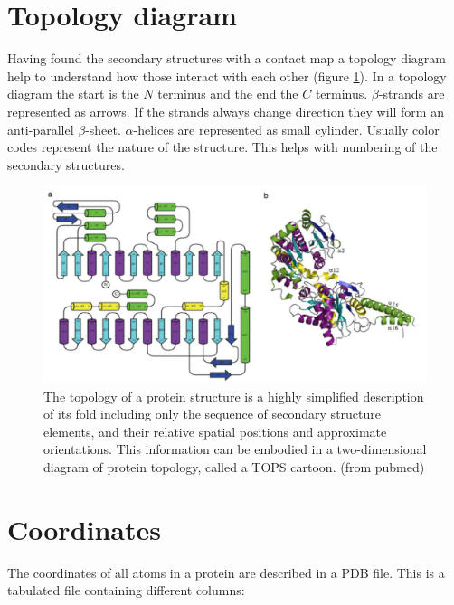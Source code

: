 \section{Topology diagram}
Having found the secondary structures with a contact map a topology diagram help to understand how those interact with each other (figure \ref{fig:topology}).
In a topology diagram the start is the $N$ terminus and the end the $C$ terminus.
$\beta$-strands are represented as arrows.
If the strands always change direction they will form an anti-parallel $\beta$-sheet.
$\alpha$-helices are represented as small cylinder.
Usually color codes represent the nature of the structure.
This helps with numbering of the secondary structures.

\begin{figure}[H]
			\centering
			\includegraphics[width=\textwidth]{topology.png}
			\caption{The topology of a protein structure is a highly simplified description of its fold including only the sequence of secondary structure elements, and their relative spatial positions and approximate orientations. This information can be embodied in a two-dimensional diagram of protein topology, called a TOPS cartoon. (from pubmed)}
			\label{fig:topology}
			\end{figure}


\section{Coordinates}
The coordinates of all atoms in a protein are described in a PDB file.
This is a tabulated file containing different columns:

